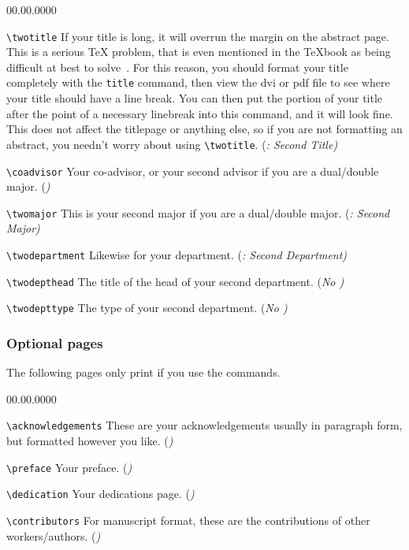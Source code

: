 \begin{lyxlist}{00.00.0000}
\item [\texttt{\textbackslash{}twotitle}]If your title is long, it will
overrun the margin on the abstract page. This is a serious \TeX{}
problem, that is even mentioned in the \TeX{}book as being difficult
at best to solve~\citep{knuth.84:TeXbook}. For this reason, you
should format your title completely with the \texttt{\noun{\textbackslash{}}}\texttt{title}
command, then view the dvi or pdf file to see where your title should
have a line break. You can then put the portion of your title after
the point of a necessary linebreak into this command, and it will
look fine. This does not affect the titlepage or anything else, so
if you are not formatting an abstract, you needn't worry about using
\texttt{\textbackslash{}twotitle}. (\emph{\LyX{}: Second Title)}
\item [\texttt{\textbackslash{}coadvisor}]Your co-advisor, or your second
advisor if you are a dual/double major. (\emph{\LyX{})}
\item [\texttt{\textbackslash{}twomajor}]This is your second major if you
are a dual/double major. (\emph{\LyX{}: Second Major)}
\item [\texttt{\textbackslash{}twodepartment}]Likewise for your department.
(\emph{\LyX{}: Second Department)}
\item [\texttt{\textbackslash{}twodepthead}]The title of the head of your
second department. (\emph{No \LyX{})}
\item [\texttt{\textbackslash{}twodepttype}]The type of your second department.
(\emph{No \LyX{})}
\end{lyxlist}

\subsubsection{Optional pages}

The following pages only print if you use the commands.

\begin{lyxlist}{00.00.0000}
\item [\texttt{\textbackslash{}acknowledgements}]These are your acknowledgements
usually in paragraph form, but formatted however you like. (\emph{\LyX{})}
\item [\texttt{\textbackslash{}preface}]Your preface. (\emph{\LyX{})}
\item [\texttt{\textbackslash{}dedication}]Your dedications page. (\emph{\LyX{})}
\item [\texttt{\textbackslash{}contributors}]For manuscript format, these
are the contributions of other workers/authors. (\emph{\LyX{})}
\end{lyxlist}

